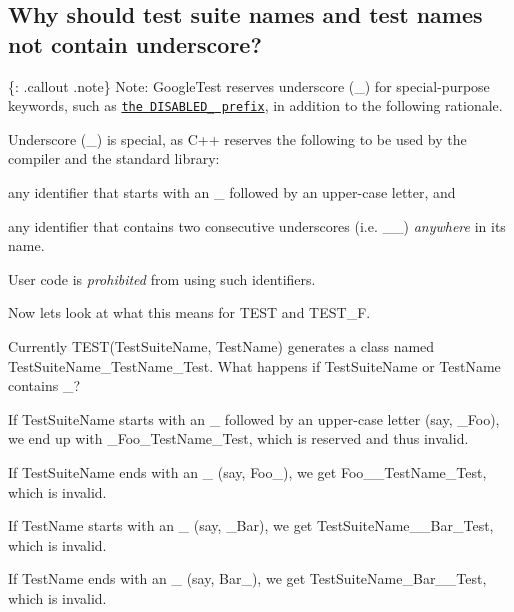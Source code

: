 \subsection*{Why should test suite names and test names not contain underscore?}

\{\+: .callout .note\} Note\+: Google\+Test reserves underscore ({\ttfamily \+\_\+}) for special-\/purpose keywords, such as \href{advanced.md#temporarily-disabling-tests}{\tt the {\ttfamily D\+I\+S\+A\+B\+L\+E\+D\+\_\+} prefix}, in addition to the following rationale.

Underscore ({\ttfamily \+\_\+}) is special, as C++ reserves the following to be used by the compiler and the standard library\+:


\begin{DoxyEnumerate}
\item any identifier that starts with an {\ttfamily \+\_\+} followed by an upper-\/case letter, and
\item any identifier that contains two consecutive underscores (i.\+e. {\ttfamily \+\_\+\+\_\+}) {\itshape anywhere} in its name.
\end{DoxyEnumerate}

User code is {\itshape prohibited} from using such identifiers.

Now let\textquotesingle{}s look at what this means for {\ttfamily T\+E\+ST} and {\ttfamily T\+E\+S\+T\+\_\+F}.

Currently {\ttfamily T\+E\+S\+T(\+Test\+Suite\+Name, Test\+Name)} generates a class named {\ttfamily Test\+Suite\+Name\+\_\+\+Test\+Name\+\_\+\+Test}. What happens if {\ttfamily Test\+Suite\+Name} or {\ttfamily Test\+Name} contains {\ttfamily \+\_\+}?


\begin{DoxyEnumerate}
\item If {\ttfamily Test\+Suite\+Name} starts with an {\ttfamily \+\_\+} followed by an upper-\/case letter (say, {\ttfamily \+\_\+\+Foo}), we end up with {\ttfamily \+\_\+\+Foo\+\_\+\+Test\+Name\+\_\+\+Test}, which is reserved and thus invalid.
\item If {\ttfamily Test\+Suite\+Name} ends with an {\ttfamily \+\_\+} (say, {\ttfamily Foo\+\_\+}), we get {\ttfamily Foo\+\_\+\+\_\+\+Test\+Name\+\_\+\+Test}, which is invalid.
\item If {\ttfamily Test\+Name} starts with an {\ttfamily \+\_\+} (say, {\ttfamily \+\_\+\+Bar}), we get {\ttfamily Test\+Suite\+Name\+\_\+\+\_\+\+Bar\+\_\+\+Test}, which is invalid.
\item If {\ttfamily Test\+Name} ends with an {\ttfamily \+\_\+} (say, {\ttfamily Bar\+\_\+}), we get {\ttfamily Test\+Suite\+Name\+\_\+\+Bar\+\_\+\+\_\+\+Test}, which is invalid.
\end{DoxyEnumerate}

